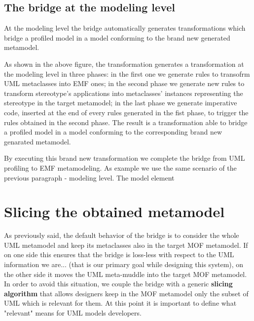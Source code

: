 \subsection{The bridge at the modeling level}\label{sec:modeLevel}


At the modeling level the bridge automatically generates transformations which bridge a profiled model in a model conforming to the brand new generated metamodel.


As shown in the above figure, the transformation generates a transformation at the modeling level in three phases: in the first one we generate rules to transofrm UML metaclasses into EMF ones; in the second phase we generate new rules to transform stereotype's applications into metaclasses' instances representing the stereotype in the target metamodel; in the last phase we generate imperative code, inserted at the end of every rules generated in the fist phase, to trigger the rules obtained in the second phase. The result is a transformation able to bridge a profiled model in a model conforming to the corresponding brand new genarated metamodel.


By executing this brand new transformation we complete the bridge from UML profiling to EMF metamodeling. As example we use the same scenario of the previous paragraph - modeling level. The model element 

\section{Slicing the obtained metamodel}\label{sec:slicing}

As previously said, the default behavior of the bridge is to consider the whole UML metamodel and keep its metaclasses also in the
target MOF metamodel. If on one side this ensures that the bridge is loss-less with respect to the UML information we are...
(that is our primary goal while designing this system),
on the other side it moves the UML meta-muddle into the target MOF metamodel. 
In order to avoid this situation, we couple the bridge with a generic \textbf{slicing algorithm} that allows designers keep  
in the MOF metamodel only the subset of UML which is relevant for them.
At this point it is important to define what "relevant" means for UML models developers.

